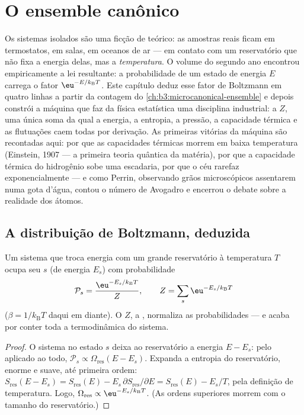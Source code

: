 \chapter{O ensemble canônico}\label{ch:b3:canonical-ensemble}

Os sistemas isolados são uma ficção de teórico: as amostras reais ficam
em termostatos, em salas, em oceanos de ar --- em contato com um
reservatório que não fixa a energia delas, mas a \emph{temperatura}. O
volume do segundo ano encontrou empiricamente a lei resultante: a
probabilidade de um estado de energia $E$ carrega o fator
$\eu^{-E/k_{\text{B}}T}$. Este capítulo deduz esse fator de Boltzmann
em quatro linhas a partir da contagem do
\cref{ch:b3:microcanonical-ensemble} e depois constrói a máquina que
faz da física estatística uma disciplina industrial: a \emph{} $Z$, uma única soma da qual a energia, a entropia, a pressão,
a capacidade térmica e as flutuações caem todas por derivação. As
primeiras vitórias da máquina são recontadas aqui: por que as
capacidades térmicas morrem em baixa temperatura (Einstein, 1907 --- a
primeira teoria quântica da matéria), por que a capacidade térmica do
hidrogênio sobe uma escadaria, por que o céu rarefaz exponencialmente
--- e como Perrin, observando grãos microscópicos assentarem numa gota
d'água, contou o número de Avogadro e encerrou o debate sobre a
realidade dos átomos.

\section{A distribuição de Boltzmann, deduzida}

\begin{theorem}\label{thm:b3:canonical-ensemble:boltzmann}
Um sistema que troca energia com um grande reservatório à temperatura
$T$ ocupa seu  $s$ (de energia $E_s$) com probabilidade
\[
\mathcal P_s = \frac{\eu^{-E_s/k_{\text{B}}T}}{Z} , \qquad
Z = \sum_s \eu^{-E_s/k_{\text{B}}T}
\]
($\beta = 1/k_{\text{B}}T$ daqui em diante). O $Z$, a \emph{}, normaliza as probabilidades --- e acaba por conter toda a
termodinâmica do sistema.
\end{theorem}

\begin{proof}
O sistema no estado $s$ deixa ao reservatório a energia $E - E_s$:
pelo  aplicado ao todo, $\mathcal P_s
\propto \Omega_{\text{res}}(E - E_s)$. Expanda a entropia do
reservatório, enorme e suave, até primeira ordem:
$S_{\text{res}}(E - E_s)
= S_{\text{res}}(E) - E_s\,\partial S_{\text{res}}/\partial E =
S_{\text{res}}(E) - E_s/T$, pela definição de temperatura. Logo,
$\Omega_{\text{res}} \propto \eu^{-E_s/k_{\text{B}}T}$. (As ordens
superiores morrem com o tamanho do reservatório.)
\end{proof}

